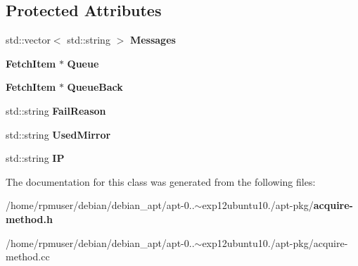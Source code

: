 \subsection*{\-Protected \-Attributes}
\begin{DoxyCompactItemize}
\item 
std\-::vector$<$ std\-::string $>$ {\bfseries \-Messages}\label{classpkgAcqMethod_a43a2b67cf6f78f2d5f0c0f3bb6edb0b1}

\item 
{\bf \-Fetch\-Item} $\ast$ {\bfseries \-Queue}\label{classpkgAcqMethod_aa467b639088af80da587d95ef79e5558}

\item 
{\bf \-Fetch\-Item} $\ast$ {\bfseries \-Queue\-Back}\label{classpkgAcqMethod_a31e05fdc9cbcbe7f4b16067036ecad9a}

\item 
std\-::string {\bfseries \-Fail\-Reason}\label{classpkgAcqMethod_a7aeb9fc72e53c123e9f36d4d6058bec8}

\item 
std\-::string {\bfseries \-Used\-Mirror}\label{classpkgAcqMethod_a0fc192c0b613d93b4ed6ddf53d2b011d}

\item 
std\-::string {\bfseries \-I\-P}\label{classpkgAcqMethod_a57430442c3d9a40c976af8e13ab34029}

\end{DoxyCompactItemize}


\-The documentation for this class was generated from the following files\-:\begin{DoxyCompactItemize}
\item 
/home/rpmuser/debian/debian\-\_\-apt/apt-\/0..$\sim$exp12ubuntu10./apt-\/pkg/{\bf acquire-\/method.\-h}\item 
/home/rpmuser/debian/debian\-\_\-apt/apt-\/0..$\sim$exp12ubuntu10./apt-\/pkg/acquire-\/method.\-cc\end{DoxyCompactItemize}
